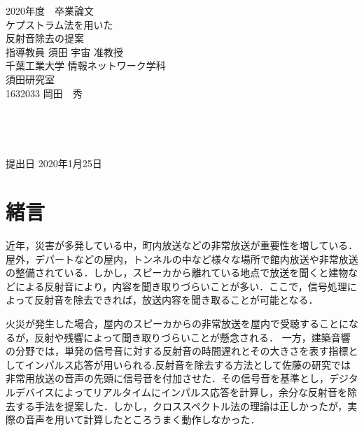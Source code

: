 \documentclass[a4j,11pt]{jsarticle}
\begin{document}
\setcounter{tocdepth}{3}
\thispagestyle{empty}
\begin{center}

\huge
2020年度　卒業論文\\[60pt]
\HUGE
ケプストラム法を用いた\\
反射音除去の提案\\[65pt]
\huge
指導教員 須田 宇宙 准教授\\[40pt]
千葉工業大学 情報ネットワーク学科\\[10pt]
須田研究室\\[40pt]
1632033 \hspace{70pt} 岡田　秀\\[110pt]
\end{center}
\begin{flushright} 
\huge

\textcolor{white}{文字}

\textcolor{white}{文字}

提出日 2020年1月25日
\end{flushright}
\newpage
\thispagestyle{empty}
\large
\tableofcontents

\newpage
\listoftables
\listoffigures

\newpage

\section{緒言}

近年，災害が多発している中，町内放送などの非常放送が重要性を増している\cite{oka1}．屋外，デパートなどの屋内，トンネルの中など様々な場所で館内放送や非常放送の整備されている．しかし，スピーカから離れている地点で放送を聞くと建物などによる反射音により，内容を聞き取りづらいことが多い．ここで，信号処理によって反射音を除去できれば，放送内容を聞き取ることが可能となる．

火災が発生した場合，屋内のスピーカからの非常放送を屋内で受聴することになるが，反射や残響によって聞き取りづらいことが懸念される．
一方，建築音響の分野では，単発の信号音に対する反射音の時間遅れとその大きさを表す指標としてインパルス応答が用いられる.反射音を除去する方法として佐藤\cite{oka2}の研究では非常用放送の音声の先頭に信号音を付加させた．その信号音を基準とし，デジタルデバイスによってリアルタイムにインパルス応答を計算し，余分な反射音を除去する手法を提案した．しかし，クロススペクトル法の理論は正しかったが，実際の音声を用いて計算したところうまく動作しなかった．
\end{document}
